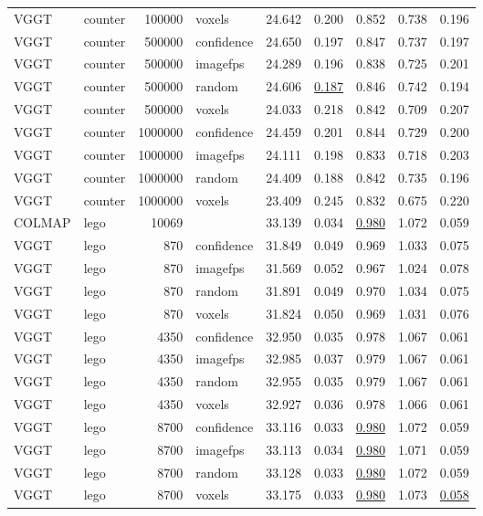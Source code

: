 \begin{table}[H]
\begin{tabular}{llrlrrrrr}
VGGT & counter & 100000 & voxels & 24.642 & 0.200 & 0.852 & 0.738 & 0.196 \\
VGGT & counter & 500000 & confidence & 24.650 & 0.197 & 0.847 & 0.737 & 0.197 \\
VGGT & counter & 500000 & imagefps & 24.289 & 0.196 & 0.838 & 0.725 & 0.201 \\
VGGT & counter & 500000 & random & 24.606 & \underline{0.187} & 0.846 & 0.742 & 0.194 \\
VGGT & counter & 500000 & voxels & 24.033 & 0.218 & 0.842 & 0.709 & 0.207 \\
VGGT & counter & 1000000 & confidence & 24.459 & 0.201 & 0.844 & 0.729 & 0.200 \\
VGGT & counter & 1000000 & imagefps & 24.111 & 0.198 & 0.833 & 0.718 & 0.203 \\
VGGT & counter & 1000000 & random & 24.409 & 0.188 & 0.842 & 0.735 & 0.196 \\
VGGT & counter & 1000000 & voxels & 23.409 & 0.245 & 0.832 & 0.675 & 0.220 \\
\midrule
COLMAP & lego & 10069 &  & 33.139 & 0.034 & \underline{0.980} & 1.072 & 0.059 \\
VGGT & lego & 870 & confidence & 31.849 & 0.049 & 0.969 & 1.033 & 0.075 \\
VGGT & lego & 870 & imagefps & 31.569 & 0.052 & 0.967 & 1.024 & 0.078 \\
VGGT & lego & 870 & random & 31.891 & 0.049 & 0.970 & 1.034 & 0.075 \\
VGGT & lego & 870 & voxels & 31.824 & 0.050 & 0.969 & 1.031 & 0.076 \\
VGGT & lego & 4350 & confidence & 32.950 & 0.035 & 0.978 & 1.067 & 0.061 \\
VGGT & lego & 4350 & imagefps & 32.985 & 0.037 & 0.979 & 1.067 & 0.061 \\
VGGT & lego & 4350 & random & 32.955 & 0.035 & 0.979 & 1.067 & 0.061 \\
VGGT & lego & 4350 & voxels & 32.927 & 0.036 & 0.978 & 1.066 & 0.061 \\
VGGT & lego & 8700 & confidence & 33.116 & 0.033 & \underline{0.980} & 1.072 & 0.059 \\
VGGT & lego & 8700 & imagefps & 33.113 & 0.034 & \underline{0.980} & 1.071 & 0.059 \\
VGGT & lego & 8700 & random & 33.128 & 0.033 & \underline{0.980} & 1.072 & 0.059 \\
VGGT & lego & 8700 & voxels & 33.175 & 0.033 & \underline{0.980} & 1.073 & \underline{0.058} \\

\end{tabular}
\end{table}
